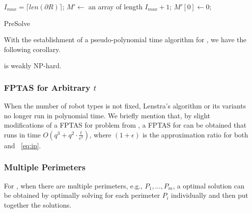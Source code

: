 \begin{algorithm}\label{algo:presol}
	\DontPrintSemicolon
		$I_{max} = \lceil len(\partial R)\rceil$; 
		$M' \leftarrow$ an array of length $I_{max} + 1$; 
		$M'[0]\leftarrow 0$;\;
	\caption{{\sc PreSolve}}
\end{algorithm}

With the establishment of a pseudo-polynomial time algorithm for \opgmc, we  
have the following corollary. 
\begin{corollary}
	\opgmc is weakly NP-hard. 
\end{corollary}

\subsubsection{FPTAS for Arbitrary $t$}
When the number of robot types is not fixed, Lenstra's algorithm\cite{len83} or 
its variants no longer run in polynomial time. We briefly mention that, 
by slight modifications of a FPTAS for \ttukp problem from \cite{ukpfptas}, a FPTAS 
for \opgmc can be obtained that runs in time $O(q^3 + q^2 \cdot \frac{t}{\epsilon^3})$, 
where $(1+\epsilon)$ is the approximation ratio for both \opgmc and ~\eqref{eq:ip}. 

\subsubsection{Multiple Perimeters} For \opgmc, when there are multiple 
perimeters, e.g., $P_1, \ldots, P_m$, a optimal solution can be obtained 
by optimally solving \opgmc for each perimeter $P_i$ individually and 
then put together the solutions. 


